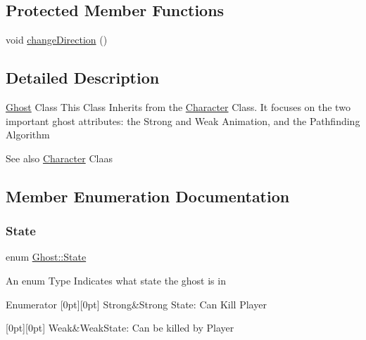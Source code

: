 \subsection*{Protected Member Functions}
\begin{DoxyCompactItemize}
\item 
void \hyperlink{class_ghost_a08831fa01afa61f91365ce82cf33bf1b}{change\+Direction} ()
\end{DoxyCompactItemize}


\subsection{Detailed Description}
\hyperlink{class_ghost}{Ghost} Class This Class Inherits from the \hyperlink{class_character}{Character} Class. It focuses on the two important ghost attributes\+: the Strong and Weak Animation, and the Pathfinding Algorithm \begin{DoxySeeAlso}{See also}
\hyperlink{class_character}{Character} Claas 
\end{DoxySeeAlso}


\subsection{Member Enumeration Documentation}
\mbox{\label{class_ghost_af712fc09f900832a0225928c4556234d}} 
\subsubsection{\texorpdfstring{State}{State}}
{\footnotesize\ttfamily enum \hyperlink{class_ghost_af712fc09f900832a0225928c4556234d}{Ghost\+::\+State}}

An enum Type Indicates what state the ghost is in \begin{DoxyEnumFields}{Enumerator}
[0pt][0pt]{}\mbox{\label{class_ghost_af712fc09f900832a0225928c4556234dacfaab1cebc10dc849b5e740dad4eb7f0}} 
Strong&Strong State\+: Can Kill Player \\
\hline

[0pt][0pt]{}\mbox{\label{class_ghost_af712fc09f900832a0225928c4556234da2728b733f9f5d557a05e6fa1aaaf174a}} 
Weak&Weak\+State\+: Can be killed by Player \\
\hline

\end{DoxyEnumFields}


